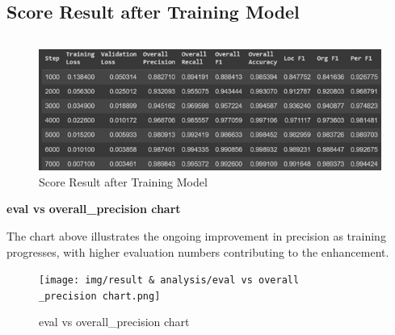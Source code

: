\subsection{Score Result after Training Model}

 
\begin{table}[H]
  
    \centering
    
    \begin{tabular}{|c|c|c|}
    \end{tabular}
    
    
\end{table}

\begin{figure}[H]
\centering
\includegraphics [scale=1]{img/result & analysis/image9.png}
\caption{ Score Result after Training Model}
\label{tab:  Score Result after Training Model}

\end{figure}
 
 
\textbf{eval vs overall\_precision chart}

The chart above illustrates the ongoing improvement in precision as training progresses, with higher evaluation numbers contributing to the enhancement.


\begin{figure}[H]
\centering
\texttt{[image: img/result \& analysis/eval vs overall\\\_precision chart.png]}
 \caption[ eval vs overall\_precision chart]{eval vs overall\_precision chart}

\end{figure}

